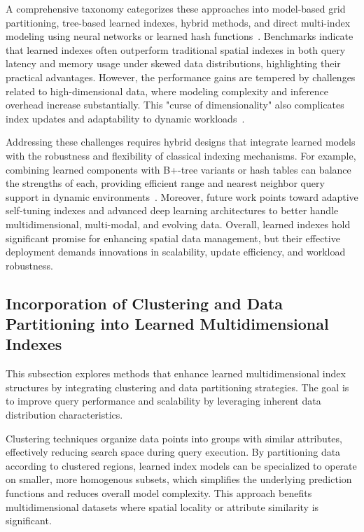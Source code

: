 \documentclass[sigconf]{acmart}
\begin{document}
A comprehensive taxonomy categorizes these approaches into model-based grid partitioning, tree-based learned indexes, hybrid methods, and direct multi-index modeling using neural networks or learned hash functions~\cite{ref34}. Benchmarks indicate that learned indexes often outperform traditional spatial indexes in both query latency and memory usage under skewed data distributions, highlighting their practical advantages. However, the performance gains are tempered by challenges related to high-dimensional data, where modeling complexity and inference overhead increase substantially. This "curse of dimensionality" also complicates index updates and adaptability to dynamic workloads~\cite{ref34,ref35}.

Addressing these challenges requires hybrid designs that integrate learned models with the robustness and flexibility of classical indexing mechanisms. For example, combining learned components with B+-tree variants or hash tables can balance the strengths of each, providing efficient range and nearest neighbor query support in dynamic environments~\cite{ref35}. Moreover, future work points toward adaptive self-tuning indexes and advanced deep learning architectures to better handle multidimensional, multi-modal, and evolving data. Overall, learned indexes hold significant promise for enhancing spatial data management, but their effective deployment demands innovations in scalability, update efficiency, and workload robustness.

\subsection{Incorporation of Clustering and Data Partitioning into Learned Multidimensional Indexes}
This subsection explores methods that enhance learned multidimensional index structures by integrating clustering and data partitioning strategies. The goal is to improve query performance and scalability by leveraging inherent data distribution characteristics.

Clustering techniques organize data points into groups with similar attributes, effectively reducing search space during query execution. By partitioning data according to clustered regions, learned index models can be specialized to operate on smaller, more homogenous subsets, which simplifies the underlying prediction functions and reduces overall model complexity. This approach benefits multidimensional datasets where spatial locality or attribute similarity is significant.
\end{document}

